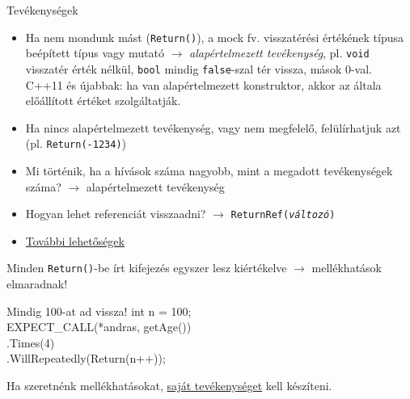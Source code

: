 \documentclass[usenames,dvipsnames,aspectratio=169]{beamer}
\newcommand{\hiv}[1]{{\color{hivatkozasszin}#1}}
\begin{document}
\begin{frame}
    Tevékenységek
    \begin{itemize}
        \item Ha nem mondunk mást (\texttt{Return()}), a mock fv. visszatérési értékének típusa beépített típus vagy mutató $\to$ \emph{alapértelmezett tevékenység}, 
        pl. \texttt{void} visszatér érték nélkül, \texttt{bool} mindig \texttt{false}-szal tér vissza, mások 0-val.\\
        C++11 és újabbak: ha van alapértelmezett konstruktor, akkor az általa előállított értéket szolgáltatják.
        \item Ha nincs alapértelmezett tevékenység, vagy nem megfelelő, felülírhatjuk azt (pl. \texttt{Return(-1234)})
        \item Mi történik, ha a hívások száma nagyobb, mint a megadott tevékenységek száma? $\to$ alapértelmezett tevékenység
        \item Hogyan lehet referenciát visszaadni? $\to$ \texttt{ReturnRef(\emph{változó})}
        \item \hiv{\href{https://google.github.io/googletest/gmock\_cook\_book.html\#using-actions}{További lehetőségek}}
    \end{itemize}
\end{frame}

\begin{frame}{}
    Minden \texttt{Return()}-be írt kifejezés egyszer lesz kiértékelve $\to$ mellékhatások elmaradnak!
    \begin{exampleblock}{Mindig 100-at ad vissza!}
        int n = 100;\\
        EXPECT\_CALL(*andras, getAge())\\
        \qquad .Times(4)\\
        \qquad .WillRepeatedly(Return(n++));\\
    \end{exampleblock}
    Ha szeretnénk mellékhatásokat, \hiv{\href{https://google.github.io/googletest/gmock\_cook\_book.html\#MockingSideEffects}{saját tevékenységet}} kell készíteni.
\end{frame}
\end{document}
